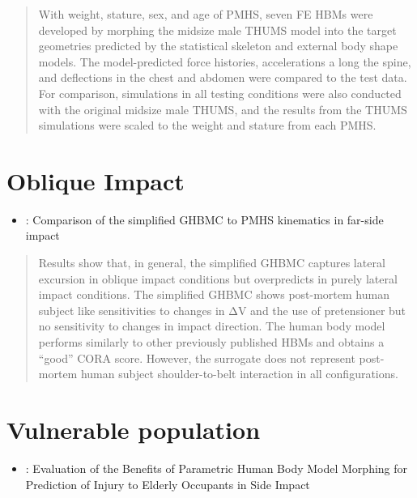 \documentclass[]{book}
\providecommand{\tightlist}{%
  \setlength{\itemsep}{0pt}\setlength{\parskip}{0pt}}
\begin{document}
\begin{quote}
With weight, stature, sex, and age of PMHS, seven FE HBMs were developed by morphing the midsize male THUMS model into the target geometries predicted by the statistical skeleton and external body shape models. The model-predicted force histories, accelerations a long the spine, and deflections in the chest and abdomen were compared to the test data. For comparison, simulations in all testing conditions were also conducted with the original midsize male THUMS, and the results from the THUMS simulations were scaled to the weight and stature from each PMHS.
\end{quote}

\citep{Hwang2019}

\hypertarget{oblique-impact}{%
\section{Oblique Impact}\label{oblique-impact}}

\begin{itemize}
\tightlist
\item
  \citet{Perez-rapela2019}: Comparison of the simplified GHBMC to PMHS kinematics in far-side impact
\end{itemize}

\begin{quote}
Results show that, in general, the simplified GHBMC captures lateral excursion in oblique impact conditions but overpredicts in purely lateral impact conditions. The simplified GHBMC shows post-mortem human subject like sensitivities to changes in ΔV and the use of pretensioner but no sensitivity to changes in impact direction. The human body model performs similarly to other previously published HBMs and obtains a ``good'' CORA score. However, the surrogate does not represent post-mortem human subject shoulder-to-belt interaction in all configurations.
\end{quote}

\hypertarget{vulnerable-population}{%
\section{Vulnerable population}\label{vulnerable-population}}

\begin{itemize}
\tightlist
\item
  \citet{Larsson2019}: Evaluation of the Benefits of Parametric Human Body Model Morphing for Prediction of Injury to Elderly Occupants in Side Impact
\end{itemize}
\end{document}
